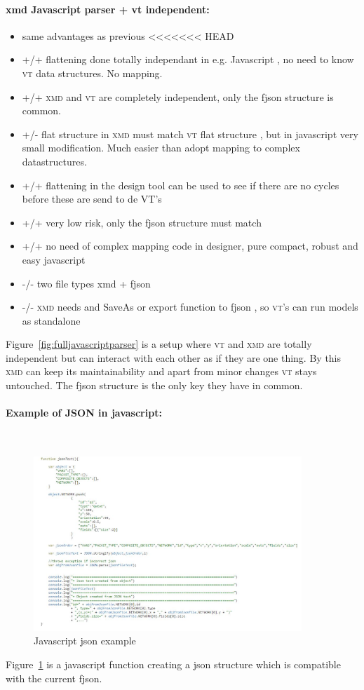 \documentclass[a4paper,11pt,final]{article}
\newcommand{\xmd}{\textsc{xmd}\xspace}%
\newcommand{\vt}{\textsc{vt}\xspace}%
\begin{document}
\paragraph{xmd Javascript parser + vt independent:}
\begin{itemize}
\item same advantages as previous
<<<<<<< HEAD
\item +/+ flattening done totally independant in e.g. Javascript , no need to know \vt 
		data structures.  No mapping.
\item +/+ \xmd and \vt are completely independent, only the fjson structure is common.
\item +/- flat structure in \xmd must match \vt flat structure , but in javascript
	very small modification. Much easier than adopt mapping to complex datastructures.
\item +/+ flattening in the design tool can be used to see if there are no cycles before these are send to de VT’s
\item +/+ very low risk, only the fjson structure must match
\item +/+ no need of complex mapping code in designer, pure compact, robust and easy javascript
\item -/- two file types xmd + fjson
\item -/- \xmd needs and SaveAs or export function to fjson , so \vt’s can run models as standalone
\end{itemize}


Figure~\ref{fig:fulljavascriptparser} is a setup where \vt and \xmd are totally independent
but can interact with each other as if they are one thing. By this \xmd can keep
its maintainability and apart from minor changes \vt stays untouched.
The fjson structure is the only key they have in common.

\paragraph{Example of JSON in javascript:}\

\begin{figure}[here]
\includegraphics[width=0.90\textwidth]{js_json}
\caption{Javascript json example}
\label{fig:js_json}
\end{figure}
Figure~\ref{fig:js_json} is a javascript function creating a json structure
which is compatible with the current fjson.
\end{document}
